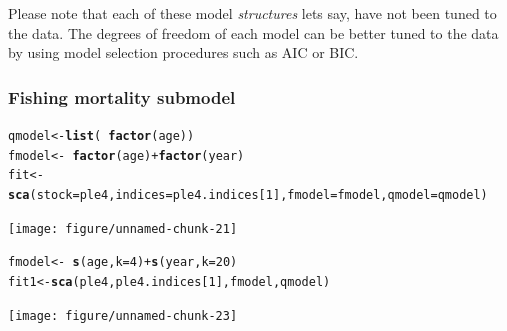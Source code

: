 \documentclass[a4paper,english,10pt]{article}\usepackage[]{graphicx}\usepackage[]{color}
\makeatletter
\newcommand{\hlnum}[1]{\textcolor[rgb]{0.686,0.059,0.569}{#1}}%
\newcommand{\hlopt}[1]{\textcolor[rgb]{0,0,0}{#1}}%
\newcommand{\hlstd}[1]{\textcolor[rgb]{0.345,0.345,0.345}{#1}}%
\newcommand{\hlkwb}[1]{\textcolor[rgb]{0.69,0.353,0.396}{#1}}%
\newcommand{\hlkwc}[1]{\textcolor[rgb]{0.333,0.667,0.333}{#1}}%
\newcommand{\hlkwd}[1]{\textcolor[rgb]{0.737,0.353,0.396}{\textbf{#1}}}%
\newenvironment{kframe}{%
 \def\at@end@of@kframe{}%
 \ifinner\ifhmode%
  \def\at@end@of@kframe{\end{minipage}}%
  \begin{minipage}{\columnwidth}%
 \fi\fi%
 \def\FrameCommand##1{\hskip\@totalleftmargin \hskip-\fboxsep
 \colorbox{shadecolor}{##1}\hskip-\fboxsep
     \hskip-\linewidth \hskip-\@totalleftmargin \hskip\columnwidth}%
 \MakeFramed {\advance\hsize-\width
   \@totalleftmargin\z@ \linewidth\hsize
   \@setminipage}}%
 {\par\unskip\endMakeFramed%
 \at@end@of@kframe}
\newenvironment{knitrout}{}{} %
\makeatother
\begin{document}
Please note that each of these model \emph{structures} lets say, have not been tuned to the data.  The degrees of freedom of each model can be better tuned to the data by using model selection procedures such as AIC or BIC.

\subsubsection{Fishing mortality submodel}

\begin{knitrout}
\color{fgcolor}\begin{kframe}
\begin{alltt}
\hlstd{qmodel} \hlkwb{<-} \hlkwd{list}\hlstd{(}\hlopt{~}\hlkwd{factor}\hlstd{(age))}
\hlstd{fmodel} \hlkwb{<-} \hlopt{~}\hlkwd{factor}\hlstd{(age)} \hlopt{+} \hlkwd{factor}\hlstd{(year)}
\hlstd{fit} \hlkwb{<-} \hlkwd{sca}\hlstd{(}\hlkwc{stock} \hlstd{= ple4,} \hlkwc{indices} \hlstd{= ple4.indices[}\hlnum{1}\hlstd{],} \hlkwc{fmodel} \hlstd{= fmodel,} \hlkwc{qmodel} \hlstd{= qmodel)}
\end{alltt}
\end{kframe}
\end{knitrout}


\begin{knitrout}
\color{fgcolor}

{\centering \texttt{[image: figure/unnamed-chunk-21]} 

}



\end{knitrout}


\begin{knitrout}
\color{fgcolor}\begin{kframe}
\begin{alltt}
\hlstd{fmodel} \hlkwb{<-} \hlopt{~}\hlkwd{s}\hlstd{(age,} \hlkwc{k} \hlstd{=} \hlnum{4}\hlstd{)} \hlopt{+} \hlkwd{s}\hlstd{(year,} \hlkwc{k} \hlstd{=} \hlnum{20}\hlstd{)}
\hlstd{fit1} \hlkwb{<-} \hlkwd{sca}\hlstd{(ple4, ple4.indices[}\hlnum{1}\hlstd{], fmodel, qmodel)}
\end{alltt}
\end{kframe}
\end{knitrout}


\begin{knitrout}
\color{fgcolor}

{\centering \texttt{[image: figure/unnamed-chunk-23]} 

}



\end{knitrout}
\end{document}

